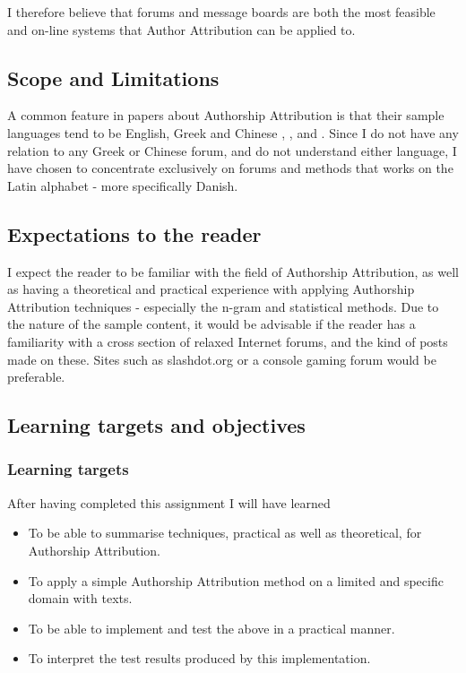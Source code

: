 I therefore believe that forums and message boards are both the most feasible and on-line systems that Author Attribution can be applied to.

\subsection{Scope and Limitations}
\label{scope}
A common feature in papers about Authorship Attribution is that their sample languages tend to be English, Greek and Chinese \cite{syntactic}, \cite{nr2}, \cite{nr4} and \cite{app-spe}. Since I do not have any relation to any Greek or Chinese forum, and do not understand either language, I have chosen to concentrate exclusively on forums and methods that works on the Latin alphabet - more specifically Danish.

\subsection{Expectations to the reader}
\label{expectations}
I expect the reader to be familiar with the field of Authorship Attribution, as well as having a theoretical and practical experience with applying Authorship Attribution techniques - especially the n-gram and statistical methods. Due to the nature of the sample content, it would be advisable if the reader has a familiarity with a cross section of relaxed Internet forums, and the kind of posts made on these. Sites such as slashdot.org or a console gaming forum would be preferable.

\subsection{Learning targets and objectives}
\label{learning}
\subsubsection{Learning targets}
After having completed this assignment I will have learned 
\begin{itemize}
\item To be able to summarise techniques, practical as well as theoretical, for Authorship Attribution.
\item To apply a simple Authorship Attribution method on a limited and specific domain with texts.
\item To be able to implement and test the above in a practical manner.
\item To interpret the test results produced by this implementation.
\end{itemize}

